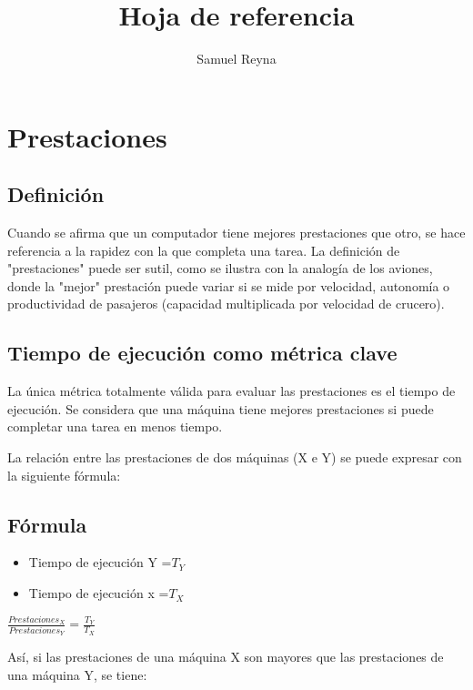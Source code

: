 \documentclass[12pt]{article}
\title{Hoja de referencia}
\author{Samuel Reyna}
\begin{document}
\maketitle
\section{Prestaciones}

\subsection*{{Definición}}

Cuando se afirma que un computador tiene mejores prestaciones que otro, 
se hace referencia a la rapidez con la que completa una tarea. 
La definición de "prestaciones" puede ser sutil, como se ilustra con la analogía de los aviones, 
donde la "mejor" prestación puede variar si se mide por velocidad, autonomía
 o productividad de pasajeros (capacidad multiplicada por velocidad de crucero).

\subsection*{Tiempo de ejecución como métrica clave}
La única métrica totalmente válida para evaluar las prestaciones es el tiempo de ejecución. 
Se considera que una máquina tiene mejores prestaciones si puede completar una tarea en menos tiempo.

La relación entre las prestaciones de dos máquinas (X e Y) se puede expresar con la siguiente fórmula:

\subsection*{Fórmula}
\begin{itemize}
    \item Tiempo de ejecución Y =$T_Y$
    \item Tiempo de ejecución x =$T_X$
\end{itemize}


    \begin{spacing}{3.0} 
        \begin{center}  
            $\displaystyle\frac{Prestaciones_X}{Prestaciones_Y}=\frac{T_Y}{T_X}$\\
        \end{center}
    \end{spacing}

Así, si las prestaciones de una máquina X son mayores que las prestaciones de una máquina Y, se tiene:\\
\end{document}

